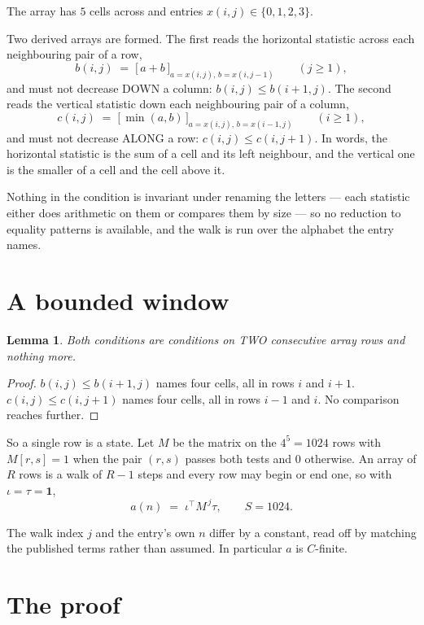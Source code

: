 \documentclass[11pt,a4paper]{article}
\theoremstyle{plain}
\newtheorem{lemma}[theorem]{Lemma}
\theoremstyle{definition}
\begin{document}
The array has $5$ cells across and entries $x(i,j)\in\{0,1,2,3\}$.

Two derived arrays are formed. The first reads the horizontal statistic across each
neighbouring pair of a row,
\[
b(i,j)\;=\;\bigl[\,a+b\,\bigr]_{a=x(i,j),\,b=x(i,j-1)}\qquad (j\ge1),
\]
and must not decrease DOWN a column: $b(i,j)\le b(i{+}1,j)$. The second reads the vertical
statistic down each neighbouring pair of a column,
\[
c(i,j)\;=\;\bigl[\,\min(a,b)\,\bigr]_{a=x(i,j),\,b=x(i{-}1,j)}\qquad (i\ge1),
\]
and must not decrease ALONG a row: $c(i,j)\le c(i,j{+}1)$. In words, the horizontal statistic
is the sum of a cell and its left neighbour, and the vertical one is
the smaller of a cell and the cell above it.

Nothing in the condition is invariant under renaming the letters --- each statistic either does
arithmetic on them or compares them by size --- so no reduction to equality patterns is
available, and the walk is run over the alphabet the entry names.

\section{A bounded window}

\begin{lemma}\label{lem:win}
Both conditions are conditions on TWO consecutive array rows and nothing more.
\end{lemma}

\begin{proof}
$b(i,j)\le b(i{+}1,j)$ names four cells, all in rows $i$ and $i+1$. $c(i,j)\le c(i,j{+}1)$
names four cells, all in rows $i-1$ and $i$. No comparison reaches further.
\end{proof}

So a single row is a state. Let $M$ be the matrix on the $4^{5}=1024$ rows with
$M[r,s]=1$ when the pair $(r,s)$ passes both tests and $0$ otherwise. An array of $R$ rows is a
walk of $R-1$ steps and every row may begin or end one, so with $\iota=\tau=\mathbf{1}$,
\[
a(n)\;=\;\iota^{\!\top}M^{\,j}\tau ,\qquad S=1024.
\]

The walk index $j$ and the entry's own $n$ differ by a constant, read off by matching the
published terms rather than assumed. In particular $a$ is $C$-finite.

\section{The proof}
\end{document}
